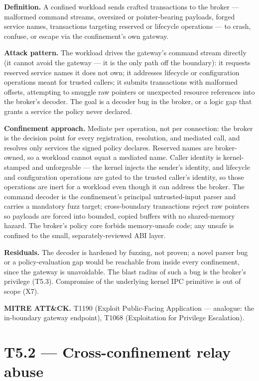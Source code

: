 \textbf{Definition.} A confined workload sends crafted transactions to
the broker --- malformed command streams, oversized or pointer-bearing
payloads, forged service names, transactions targeting reserved or
lifecycle operations --- to crash, confuse, or escape via the
confinement's own gateway.

\textbf{Attack pattern.} The workload drives the gateway's command
stream directly (it cannot avoid the gateway --- it is the only path off
the boundary): it requests reserved service names it does not own; it
addresses lifecycle or configuration operations meant for trusted
callers; it submits transactions with malformed offsets, attempting to
smuggle raw pointers or unexpected resource references into the broker's
decoder. The goal is a decoder bug in the broker, or a logic gap that
grants a service the policy never declared.

\textbf{Confinement approach.} Mediate per operation, not per
connection: the broker is the decision point for every registration,
resolution, and mediated call, and resolves only services the signed
policy declares. Reserved names are broker-owned, so a workload cannot
squat a mediated name. Caller identity is kernel-stamped and unforgeable
--- the kernel injects the sender's identity, and lifecycle and
configuration operations are gated to the trusted caller's identity, so
those operations are inert for a workload even though it can address the
broker. The command decoder is the confinement's principal
untrusted-input parser and carries a mandatory fuzz target;
cross-boundary transactions reject raw pointers so payloads are forced
into bounded, copied buffers with no shared-memory hazard. The broker's
policy core forbids memory-unsafe code; any unsafe is confined to the
small, separately-reviewed ABI layer.

\textbf{Residuals.} The decoder is hardened by fuzzing, not proven; a
novel parser bug or a policy-evaluation gap would be reachable from
inside every confinement, since the gateway is unavoidable. The blast
radius of such a bug is the broker's privilege (T5.3). Compromise of the
underlying kernel IPC primitive is out of scope (X7).

\textbf{MITRE ATT\&CK.} T1190 (Exploit Public-Facing Application ---
analogue: the in-boundary gateway endpoint), T1068 (Exploitation for
Privilege Escalation).

\hypertarget{t5.2-cross-confinement-relay-abuse}{%
\section{T5.2 --- Cross-confinement relay
abuse}\label{t5.2-cross-confinement-relay-abuse}}

